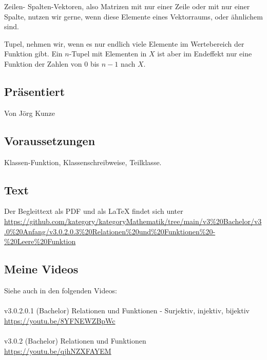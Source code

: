 \documentclass[a4paper]{amsart}
\theoremstyle{definition}
\begin{document}
Zeilen- Spalten-Vektoren, also Matrizen mit nur einer Zeile oder mit nur einer Spalte, nutzen wir gerne, wenn diese Elemente eines Vektorraums, oder ähnlichem sind.

Tupel, nehmen wir, wenn es nur endlich viele Elemente im Wertebereich der Funktion gibt. Ein $n$-Tupel  mit Elementen in $X$ ist aber im Endeffekt nur eine Funktion der Zahlen von $0$ bis $n-1$ nach $X$.

\subsection*{Präsentiert}
Von Jörg Kunze

\subsection*{Voraussetzungen}
Klassen-Funktion, Klassenschreibweise, Teilklasse.

\subsection*{Text}
Der Begleittext als PDF und als LaTeX findet sich unter
{\tiny
   \url{https://github.com/kategory/kategoryMathematik/tree/main/v3%20Bachelor/v3.0%20Anfang/v3.0.2.0.3%20Relationen%20und%20Funktionen%20-%20Leere%20Funktion}
}

\subsection*{Meine Videos}
Siehe auch in den folgenden Videos:\\
\\
v3.0.2.0.1 (Bachelor) Relationen und Funktionen - Surjektiv, injektiv, bijektiv\\
\url{https://youtu.be/8YFNEWZBpWc}\\
\\
v3.0.2 (Bachelor) Relationen und Funktionen\\
\url{https://youtu.be/qjhNZXFAYEM}
\end{document}
